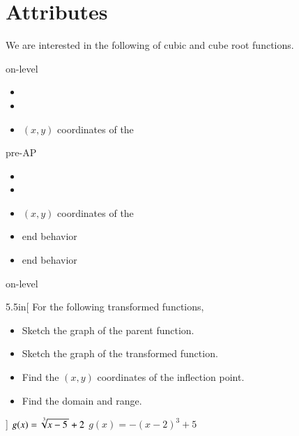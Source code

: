 \section{Attributes}

We are interested in the following  of cubic and cube root functions.
\vspace{-0.5\baselineskip}
\begin{taggedblock}{on-level}
\begin{itemize}[nosep]
    \item {}
    \item {}
    \item $(x,y)$ coordinates of the 
\end{itemize}
\end{taggedblock}
\begin{taggedblock}{pre-AP}
    \begin{itemize}[nosep]
        \item {}
        \item {}
        \item $(x,y)$ coordinates of the 
        \item {} end behavior
        \item {} end behavior
    \end{itemize}    
\end{taggedblock}


\begin{taggedblock}{on-level}
    \begin{my2Problems}{5.5in}[
        For the following transformed functions,
        \vspace{-0.75\baselineskip}
        \small
        \begin{itemize}[nosep]
            \item Sketch the graph of the parent function.
            \item Sketch the graph of the transformed function.
            \item Find the $(x,y)$ coordinates of the inflection point.
            \item Find the domain and range.
        \end{itemize}
        ]
        {
            $g(x) = \myRoot[3]{x-5} +2$
        }
        {
            $g(x) = -(x-2)^3 + 5$
        }
    \end{my2Problems}
\end{taggedblock}

